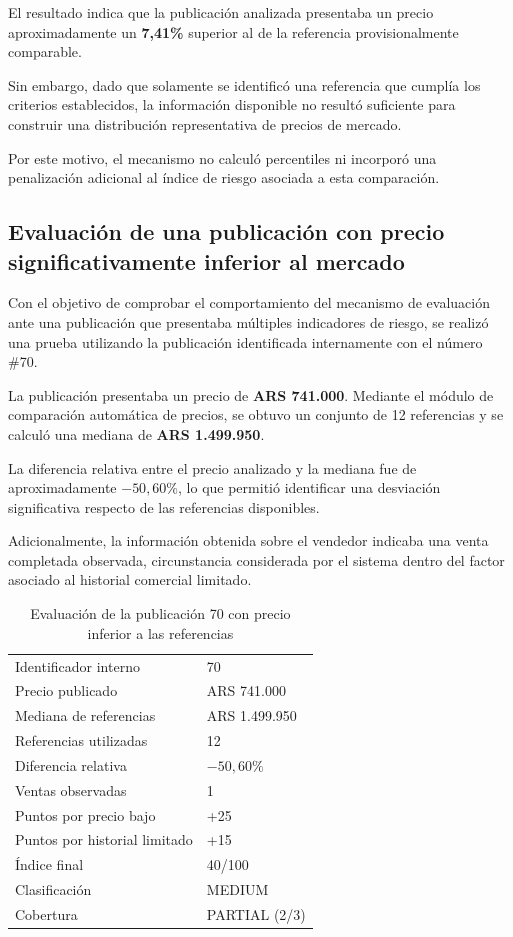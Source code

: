 El resultado indica que la publicación analizada presentaba un precio
aproximadamente un \textbf{7,41\%} superior al de la referencia
provisionalmente comparable.

Sin embargo, dado que solamente se identificó una referencia que cumplía
los criterios establecidos, la información disponible no resultó
suficiente para construir una distribución representativa de precios de
mercado.

Por este motivo, el mecanismo no calculó percentiles ni incorporó una
penalización adicional al índice de riesgo asociada a esta comparación.

\subsection{Evaluación de una publicación con precio significativamente inferior al mercado}

Con el objetivo de comprobar el comportamiento del mecanismo de
evaluación ante una publicación que presentaba múltiples indicadores de
riesgo, se realizó una prueba utilizando la publicación identificada
internamente con el número \#70.

La publicación presentaba un precio de \textbf{ARS 741.000}. Mediante el
módulo de comparación automática de precios, se obtuvo un conjunto de 12
referencias y se calculó una mediana de \textbf{ARS 1.499.950}.

La diferencia relativa entre el precio analizado y la mediana fue de
aproximadamente \textbf{$-50{,}60\%$}, lo que permitió identificar una
desviación significativa respecto de las referencias disponibles.

Adicionalmente, la información obtenida sobre el vendedor indicaba una
venta completada observada, circunstancia considerada por el sistema
dentro del factor asociado al historial comercial limitado.

\begin{table}[H]
\centering
\caption{Evaluación de la publicación 70 con precio inferior a las referencias}
\label{tab:ml-riesgo-70}
\small
\begin{tabularx}{\textwidth}{L l}
\toprule
{} &  \\
\midrule
Identificador interno & 70 \\
Precio publicado & ARS 741.000 \\
Mediana de referencias & ARS 1.499.950 \\
Referencias utilizadas & 12 \\
Diferencia relativa & $-50{,}60\%$ \\
Ventas observadas & 1 \\
Puntos por precio bajo & +25 \\
Puntos por historial limitado & +15 \\
Índice final & 40/100 \\
Clasificación & MEDIUM \\
Cobertura & PARTIAL (2/3) \\
\bottomrule
\end{tabularx}
\end{table}


